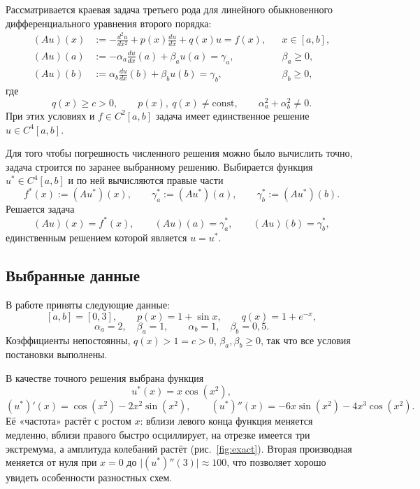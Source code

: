\documentclass[12pt,a4paper]{article}
\begin{document}
Рассматривается краевая задача третьего рода для линейного
обыкновенного дифференциального уравнения второго порядка:
\begin{equation}\label{eq:general}
\begin{aligned}
(Au)(x) &:= -\frac{d^2u}{dx^2} + p(x)\frac{du}{dx} + q(x)u = f(x),
   && x\in[a,b],\\[1mm]
(Au)(a) &:= -\alpha_a\frac{du}{dx}(a) + \beta_a u(a) = \gamma_a,
   && \beta_a\ge 0,\\[1mm]
(Au)(b) &:= \alpha_b\frac{du}{dx}(b) + \beta_b u(b) = \gamma_b,
   && \beta_b\ge 0,
\end{aligned}
\end{equation}
где
\[
q(x)\ge c>0,\qquad p(x),\ q(x)\neq \mathrm{const},\qquad
\alpha_a^2+\alpha_b^2\neq 0 .
\]
При этих условиях и $f\in C^2[a,b]$ задача имеет единственное решение
$u\in C^4[a,b]$.

Для того чтобы погрешность численного решения можно было вычислить
точно, задача строится по заранее выбранному решению. Выбирается
функция $u^{\ast}\in C^4[a,b]$ и по ней вычисляются правые части
\[
f^{\ast}(x) := (Au^{\ast})(x),\qquad
\gamma_a^{\ast} := (Au^{\ast})(a),\qquad
\gamma_b^{\ast} := (Au^{\ast})(b).
\]
Решается задача
\begin{equation}\label{eq:test}
(Au)(x) = f^{\ast}(x),\qquad (Au)(a) = \gamma_a^{\ast},\qquad
(Au)(b) = \gamma_b^{\ast},
\end{equation}
единственным решением которой является $u = u^{\ast}$.

\subsection{Выбранные данные}

В работе приняты следующие данные:
\[
[a,b] = [0,3],\qquad p(x) = 1+\sin x,\qquad q(x) = 1+e^{-x},
\]
\[
\alpha_a = 2,\quad \beta_a = 1,\qquad \alpha_b = 1,\quad \beta_b = 0{,}5 .
\]
Коэффициенты непостоянны, $q(x) > 1 = c > 0$, $\beta_a,\beta_b\ge 0$,
так что все условия постановки выполнены.

В качестве точного решения выбрана функция
\[
u^{\ast}(x) = x\cos(x^2),
\]
\[
(u^{\ast})'(x) = \cos(x^2) - 2x^2\sin(x^2),\qquad
(u^{\ast})''(x) = -6x\sin(x^2) - 4x^3\cos(x^2).
\]
Её «частота» растёт с ростом $x$: вблизи левого конца функция меняется
медленно, вблизи правого быстро осциллирует, на отрезке имеется три
экстремума, а амплитуда колебаний растёт (рис.~\ref{fig:exact}).
Вторая производная меняется от нуля при $x=0$ до
$\lvert (u^{\ast})''(3)\rvert\approx 100$, что позволяет хорошо увидеть
особенности разностных схем.
\end{document}
